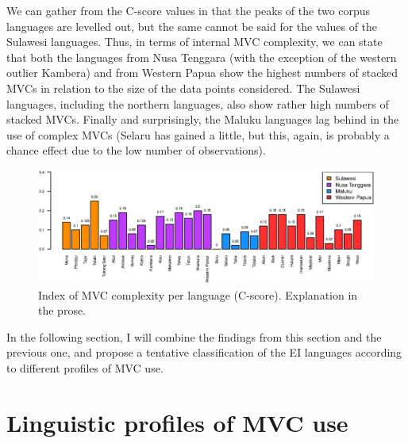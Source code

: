 We can gather from the C-score values in  that the peaks of the two corpus languages are levelled out, but the same cannot be said for the values of the Sulawesi languages. Thus, in terms of internal MVC complexity, we can state that both the languages from Nusa Tenggara (with the exception of the western outlier Kambera) and from Western Papua show the highest numbers of stacked MVCs in relation to the size of the data points considered. The Sulawesi languages, including the northern languages, also show rather high numbers of stacked MVCs. Finally and surprisingly, the Maluku languages lag behind in the use of complex MVCs (Selaru has gained a little, but this, again, is probably a chance effect due to the low number of observations). 

\begin{figure}
\includegraphics[width=\textwidth]{figures/index_MVCcomplexity_clean.eps}
\caption[Index of MVC complexity per language]{Index of MVC complexity per language (C-score). Explanation in the prose.}\label{fig:complexity}
\end{figure}

In the following section, I will combine the findings from this section and the previous one, and propose a tentative classification of the EI languages according to different profiles of MVC use.

\section{Linguistic profiles of MVC use} \label{sec:profile_use}

